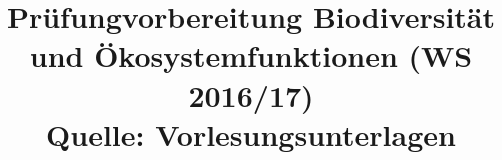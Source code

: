 \documentclass[12pt,a4paper]{article}
\title{\Huge\textbf{Prüfungvorbereitung Biodiversität und Ökosystemfunktionen (WS 2016/17)} \\ Quelle: Vorlesungsunterlagen}
\author{}
\date{}
\begin{document}
\begin{titlepage}

\maketitle
\thispagestyle{empty}
\end{titlepage}
\newpage

\begin{titlepage}
\tableofcontents
\thispagestyle{empty}
\end{titlepage}
\newpage



\newpage



\newpage



\newpage



\newpage



\newpage



\newpage



\newpage



\newpage



\newpage



\newpage



\newpage



\newpage



\newpage


\end{document}

